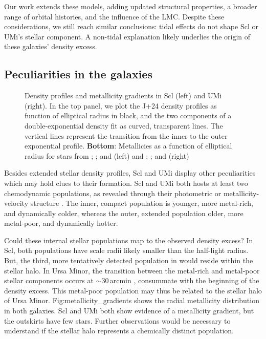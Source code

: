 Our work extends these models, adding updated structural properties, a
broader range of orbital histories, and the influence of the LMC.
Despite these considerations, we still reach similar conclusions: tidal
effects do not shape Scl or UMi's stellar component. A non-tidal
explanation likely underlies the origin of these galaxies' density
excess.

\subsection{Peculiarities in the
galaxies}\label{peculiarities-in-the-galaxies}

\begin{figure}
\centering
{}
\caption[Metallicity gradients in Scl and UMi]{Density profiles and
metallicity gradients in Scl (left) and UMi (right). In the top panel,
we plot the J+24 density profiles as function of elliptical radius in
black, and the two components of a double-exponential density fit as
curved, transparent lines. The vertical lines represent the transition
from the inner to the outer exponential profile. \textbf{Bottom}:
Metallicies as a function of elliptical radius for stars from
\citet{tolstoy+2023}; \citet{apogee}; and \citet{sestito+2023} (left)
and \citet{pace+2020}; \citet{apogee}; and \citet{sestito+2023b}
(right)}\label{fig:metallicity_gradients}
\end{figure}

Besides extended stellar density profiles, Scl and UMi display other
peculiarities which may hold clues to their formation. Scl and UMi both
hosts at least two chemodynamic populations, as revealed through their
photometric or metallicity-velocity structure
\citep{tolstoy+2004, battaglia+2008, pace+2020}. The inner, compact
population is younger, more metal-rich, and dynamically colder, whereas
the outer, extended population older, more metal-poor, and dynamically
hotter.

Could these internal stellar populations map to the observed density
excess? In Scl, both populations have scale radii likely smaller than
the half-light radius. But, the third, more tentatively detected
population in \citet{arroyo-polonio+2024} would reside within the
stellar halo. In Ursa Minor, the transition between the metal-rich and
metal-poor stellar components occurs at \(\sim 30\,\)arcmin
\citep{pace2020}, consummate with the beginning of the density excess.
This metal-poor population may thus be related to the stellar halo of
Ursa Minor. Fig:metallicity\_gradients shows the radial metallicity
distribution in both galaxies. Scl and UMi both show evidence of a
metallicity gradient, but the outskirts have few stars. Further
observations would be necessary to understand if the stellar halo
represents a chemically distinct population.

